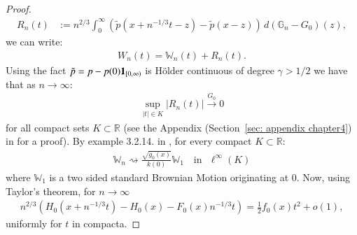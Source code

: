 \begin{proof}
\begin{align*}
R_n(t) &:= n^{2/3} \int_0^\infty (\tilde{p}(x + n^{-1/3}t - z) - \tilde{p}(x - z)) \, d(\mathbb{G}_n - G_0)(z),
\end{align*}
we can write:
\begin{align}\label{eq: W_n decomposition}
	W_n(t) = \mathbb{W}_n(t) + R_n(t).
\end{align}
Using the fact $\tilde{p} = p - p(0) \mathbf{1}_{[0,\infty)}$ is H\"{o}lder continuous of degree $\gamma > 1/2$ we have that as $n \to \infty$:
\begin{align}\label{eq: residual term convergence}
	\sup_{|t| \in K} |R_n(t)| \xrightarrow{G_0} 0 
\end{align}
for all compact sets $K \subset \mathbb{R}$ (see the Appendix (Section~\ref{sec: appendix chapter4}) in \cite{74} for a proof). By example 3.2.14. in \cite{5}, for every compact $K \subset \mathbb{R}$:
\begin{align}\label{eq: mathbbW_n convergence}
	\mathbb{W}_n \rightsquigarrow \frac{\sqrt{g_0(x)}}{k(0)} \mathbb{W}_1 \quad \text{in } \, \, \ell^\infty(K)
\end{align}
where $\mathbb{W}_1$ is a two sided standard Brownian Motion originating at $0$. Now, using Taylor's theorem, for $n \to \infty$
\begin{align}\label{eq: Taylor expansion}
	n^{2/3} (H_0(x + n^{-1/3}t) - H_0(x) - F_0(x) n^{-1/3}t) = \frac{1}{2} f_0(x) t^2 + o(1),
\end{align}
uniformly for $t$ in compacta. 


\end{proof}
